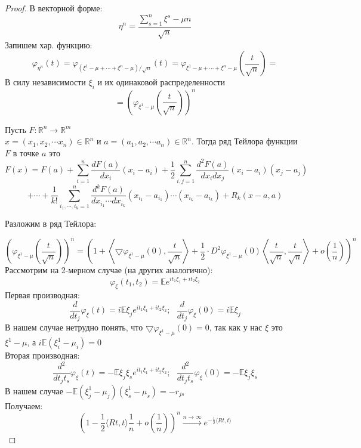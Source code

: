 \begin{proof}
В векторной форме:
\[  
    \eta^{n} = \dfrac{\sum\limits_{s=1}^{n}\xi^{s} - \mu n}{\sqrt{n}}
\]
Запишем хар. функцию:
\[
    \varphi_{\eta^{n}}(t) = \varphi_{(\xi^{1} - \mu + \cdots + \xi^{n} - \mu)/\sqrt{n}}(t) = \varphi_{\xi^{1} - \mu + \cdots + \xi^{n} - \mu}\left(\frac{t}{\sqrt{n}}\right) = 
    \]
    В силу независимости $\xi_i$ и их одинаковой распределенности
    \[
        = \left(\varphi_{\xi^{1} - \mu}\left(\frac{t}{\sqrt{n}}\right)\right)^n
    \]
    \begin{reminder}
    Пусть $F: \mathbb{R}^n \to \mathbb{R}^m$\\
    $x = (x_1, x_2, \cdots x_n) \in \mathbb{R}^n$ и $a = (a_1, a_2, \cdots a_n) \in \mathbb{R}^n$. Тогда ряд Тейлора функции $F$ в точке $a$ это
    \[
        F(x) = F(a) + \sum\limits_{i = 1}^{n}\dfrac{dF(a)}{dx_i}(x_i-a_i) + \dfrac{1}{2}\sum\limits_{i,j=1}^{n}\dfrac{d^2F(a)}{dx_i dx_j}(x_i-a_i)(x_j-a_j)
    \]
    \[
        + \cdots + \dfrac{1}{k!}\sum\limits_{i_1, \cdots, i_k = 1}^{n} \dfrac{d^kF(a)}{dx_{i_1}\cdots dx_{i_k}}(x_{i_1}-a_{i_1})\cdots(x_{i_k}-a_{i_k}) + R_k(x-a,a)
    \]
    \end{reminder}
    \begin{flushleft}
    Разложим в ряд Тейлора:
    \end{flushleft}
\[
    \left(\varphi_{\xi^{1} - \mu}\left(\frac{t}{\sqrt{n}}\right)\right)^n = \left(1 + \left\langle \bigtriangledown \varphi_{\xi^{1} - \mu}(0), \frac{t}{\sqrt{n}} \right\rangle + \frac{1}{2}\cdot D^2\varphi_{\xi^{1} - \mu}(0) \left<\frac{t}{\sqrt{n}}, \frac{t}{\sqrt{n}}\right>  + o\left(\frac1n\right)\right)^n
\]
Рассмотрим на 2-мерном случае (на других аналогично):
\[
    \varphi_{\xi}(t_1, t_2) = \mathbb{E}e^{it_1\xi_1 + it_2 \xi_2}
\]
Первая производная:
\[
    \frac{d}{d t_{j}} \varphi_{\xi}(t) = i\mathbb{E}\xi_{j} e^{it_1\xi_1 + it_2 \xi_2}; \text{ } \frac{d}{d t_{j}} \varphi_{\xi}(0) = i\mathbb{E}\xi_{j}
\]
В нашем случае нетрудно понять, что $\bigtriangledown \varphi_{\xi^{1} - \mu}(0) = 0$, так как у нас $\xi$ это $\xi^{1} - \mu$, а $i\mathbb{E}(\xi_{i}^{1} - \mu_{i}) = 0$\\
Вторая производная:
\[
    \dfrac{d^2}{d t_{j} t_{s}} \varphi_{\xi}(t) = -\mathbb{E}\xi_{j} \xi_{s} e^{it_1\xi_1 + it_2 \xi_2}; \text{ } \frac{d^2}{d t_{j} t_{s}} \varphi_{\xi}(0) = -\mathbb{E}\xi_{j}\xi_{s}
\]
В нашем случае $-\mathbb{E}(\xi_{j}^{1} - \mu_{j})(\xi_{s}^{1} - \mu_{s}) = -r_{js}$\\
Получаем:
\[
    \left(1 - \dfrac{1}{2}\langle Rt, t \rangle \frac{1}{n} + o\left(\frac1n\right)\right)^n \xrightarrow{n \to \infty} e^{-\frac{1}{2}\langle Rt, t \rangle}
\]
\end{proof}

